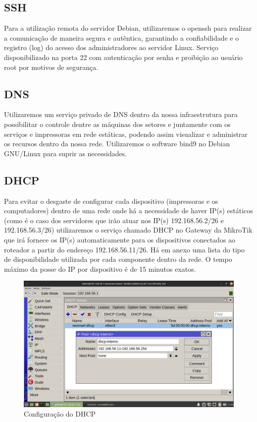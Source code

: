 \documentclass[12pt]{article}
\begin{document}
\subsection{SSH}
Para a utilização remota do servidor Debian, utilizaremos o openssh para realizar a comunicação de maneira segura e autêntica, garantindo a confiabilidade e o registro (log) do acesso dos administradores ao servidor Linux. Serviço disponibilizado na porta 22 com autenticação por senha e proibição ao usuário root por motivos de segurança.

\subsection{DNS}
Utilizaremos um serviço privado de DNS dentro da nossa infraestrutura para possibilitar o controle dentre as máquinas dos setores e juntamente com os serviços e impressoras em rede estáticas, podendo assim visualizar e administrar os recursos dentro da nossa rede. Utilizaremos o software bind9 no Debian GNU/Linux para suprir as necessidades.

\subsection{DHCP}
Para evitar o desgaste de configurar cada dispositivo (impressoras e os computadores) dentro de uma rede onde há a necessidade de haver IP(s) estáticos (como é o caso dos servidores que irão atuar nos IP(s) 192.168.56.2/26 e 192.168.56.3/26) utilizaremos o serviço chamado DHCP no Gateway da MikroTik que irá fornece os IP(s) automaticamente para os dispositivos conectados ao roteador a partir do endereço 192.168.56.11/26. Há em anexo uma lista do tipo de disponibilidade utilizada por cada componente dentro da rede. O tempo máximo da posse do IP por dispositivo é de 15 minutos exatos.

\begin{figure}[ht]
\centering
\includegraphics[height=0.5\textwidth]{roteador-dhcp-range.png}
\caption{Configuração do DHCP}
\label{fig:dhcp}
\end{figure}
\end{document}

